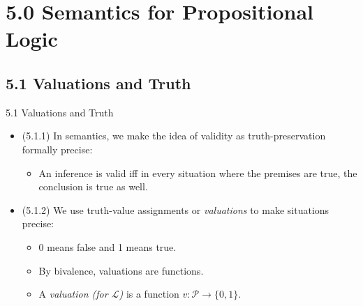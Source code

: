 \documentclass[../slides.tex]{subfiles}
\begin{document}
\section{5.0 Semantics for Propositional Logic}
\subsection{5.1 Valuations and Truth}

\begin{frame}{5.1 Valuations and Truth}

	\begin{itemize}
	
		\item (5.1.1) In semantics, we make the idea of validity as truth-preservation formally precise:
		
		\begin{itemize}
		
			\item An inference is valid iff in every situation where the premises are true, the conclusion is true as well.
		
		\end{itemize}
		
		
		\item (5.1.2) We use truth-value assignments or \emph{valuations} to make situations precise:
		
		\begin{itemize}		
		
			\item 0 means false and 1 means true.
			
			\item By bivalence, valuations are functions.
									
			\item A \emph{valuation (for $\mathcal{L}$)} is a function $v:\mathcal{P}\to\{0,1\}$. 
			
		\end{itemize}
		
	\end{itemize}

\end{frame}
\end{document}

